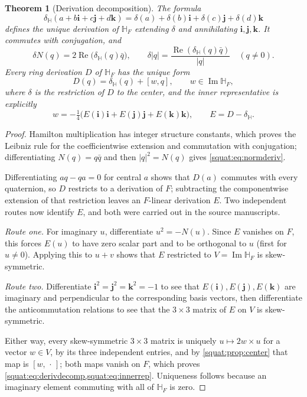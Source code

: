 \documentclass[11pt,letterpaper]{article}
\numberwithin{equation}{section}
\newtheorem{theorem}{Theorem}[section]
\theoremstyle{definition}
\theoremstyle{remark}
\newcommand{\HF}{\mathbb H_F}
\newcommand{\ii}{\mathbf i}
\newcommand{\jj}{\mathbf j}
\newcommand{\kk}{\mathbf k}
\newcommand{\Rea}{\operatorname{Re}}
\newcommand{\Ima}{\operatorname{Im}}
\newcommand{\abs}[1]{\left|#1\right|}
\newcommand{\delH}{\delta_{\mathbb H}}
\begin{document}
\begin{theorem}[Derivation decomposition]\label{squat:thm:derivations}
The formula
\begin{equation}\label{squat:eq:coeffderiv}
 \delH(a+b\ii+c\jj+d\kk)=\delta(a)+\delta(b)\ii+\delta(c)\jj+\delta(d)\kk
\end{equation}
defines the unique derivation of $\HF$ extending $\delta$ and annihilating $\ii,\jj,\kk$.
It commutes with conjugation, and
\begin{equation}\label{squat:eq:normderiv}
 \delta N(q)=2\Rea\bigl(\delH(q)\bar q\bigr),\qquad
 \delta\abs q=\frac{\Rea(\delH(q)\bar q)}{\abs q}\quad(q\ne0).
\end{equation}
Every ring derivation $D$ of $\HF$ has the unique form
\begin{equation}\label{squat:eq:derivdecomp}
 D(q)=\delH(q)+[w,q],\qquad w\in\Ima\HF,
\end{equation}
where $\delta$ is the restriction of $D$ to the center, and the inner representative is
explicitly
\begin{equation}\label{squat:eq:innerrep}
 w=-\tfrac14\bigl(E(\ii)\ii+E(\jj)\jj+E(\kk)\kk\bigr),\qquad E=D-\delH .
\end{equation}
\end{theorem}
\begin{proof}
Hamilton multiplication has integer structure constants, which proves the Leibniz rule for
the coefficientwise extension and commutation with conjugation; differentiating
$N(q)=q\bar q$ and then $\abs q^2=N(q)$ gives \cref{squat:eq:normderiv}.

Differentiating $aq-qa=0$ for central $a$ shows that $D(a)$ commutes with every
quaternion, so $D$ restricts to a derivation of $F$; subtracting the componentwise
extension of that restriction leaves an $F$-linear derivation $E$. Two independent routes
now identify $E$, and both were carried out in the source manuscripts.

\emph{Route one.} For imaginary $u$, differentiate $u^2=-N(u)$. Since $E$ vanishes on $F$,
this forces $E(u)$ to have zero scalar part and to be orthogonal to $u$ (first for
$u\ne0$). Applying this to $u+v$ shows that $E$ restricted to $V=\Ima\HF$ is
skew-symmetric.

\emph{Route two.} Differentiate $\ii^2=\jj^2=\kk^2=-1$ to see that
$E(\ii),E(\jj),E(\kk)$ are imaginary and perpendicular to the corresponding basis vectors,
then differentiate the anticommutation relations to see that the $3\times3$ matrix of $E$
on $V$ is skew-symmetric.

Either way, every skew-symmetric $3\times3$ matrix is uniquely $u\mapsto2w\times u$ for a
vector $w\in V$, by its three independent entries, and by \cref{squat:prop:center} that map
is $[w,\,\cdot\,]$; both maps vanish on $F$, which proves
\cref{squat:eq:derivdecomp,squat:eq:innerrep}. Uniqueness follows because an imaginary
element commuting with all of $\HF$ is zero.
\end{proof}
\end{document}

